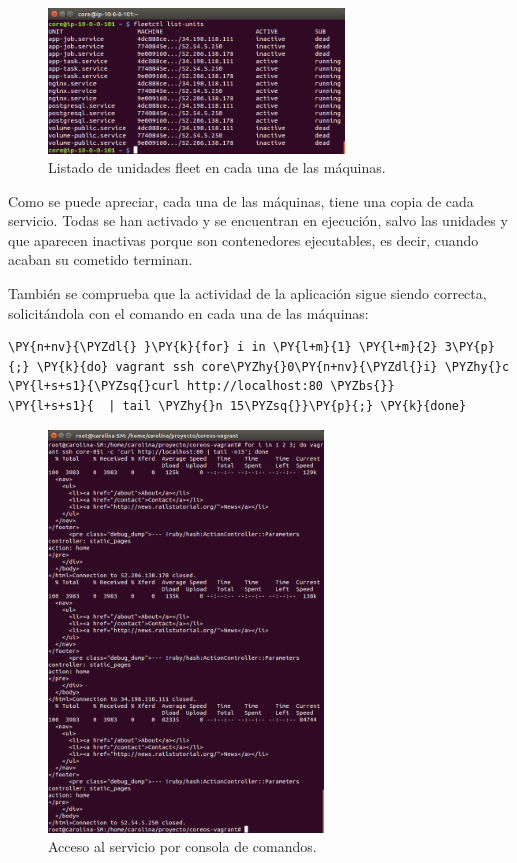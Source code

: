 \begin{figure}[H]
\centering
\includegraphics[width=0.7\textwidth]{images/figures/fleetctl-list-units.png}
\caption{Listado de unidades fleet en cada una de las máquinas.}
\end{figure}

Como se puede apreciar, cada una de las máquinas, tiene una copia de cada servicio. Todas se han activado y se encuentran en ejecución, salvo las unidades  y  que aparecen inactivas porque son contenedores ejecutables, es decir, cuando acaban su cometido terminan.

También se comprueba que la actividad de la aplicación sigue siendo correcta, solicitándola con el comando  en cada una de las máquinas:

\begin{framed_shaded}
\begin{Verbatim}[fontsize=\relsize{-2.5},fontseries=b,commandchars=\\\{\}]
\PY{n+nv}{\PYZdl{} }\PY{k}{for} i in \PY{l+m}{1} \PY{l+m}{2} 3\PY{p}{;} \PY{k}{do} vagrant ssh core\PYZhy{}0\PY{n+nv}{\PYZdl{}i} \PYZhy{}c \PY{l+s+s1}{\PYZsq{}curl http://localhost:80 \PYZbs{}}
\PY{l+s+s1}{  | tail \PYZhy{}n 15\PYZsq{}}\PY{p}{;} \PY{k}{done}
\end{Verbatim}
\end{framed_shaded}

\begin{figure}[H]
\centering
\includegraphics[width=0.65\textwidth]{images/figures/curl-fleet.png}
\caption{Acceso al servicio por consola de comandos.}
\end{figure}

